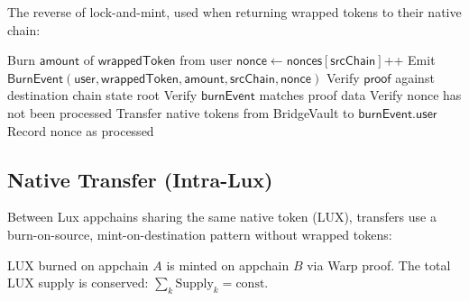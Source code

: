 The reverse of lock-and-mint, used when returning wrapped tokens to their native chain:

\begin{algorithm}[H]
\caption{Burn-and-Release Transfer Protocol}
\label{alg:burn_release}
\begin{algorithmic}[1]
    \State Burn $\mathsf{amount}$ of $\mathsf{wrappedToken}$ from user
    \State $\mathsf{nonce} \gets \mathsf{nonces}[\mathsf{srcChain}]$++
    \State Emit $\mathsf{BurnEvent}(\mathsf{user}, \mathsf{wrappedToken}, \mathsf{amount}, \mathsf{srcChain}, \mathsf{nonce})$
\EndProcedure
{}
    \State Verify $\mathsf{proof}$ against destination chain state root
    \State Verify $\mathsf{burnEvent}$ matches proof data
    \State Verify nonce has not been processed
    \State Transfer native tokens from BridgeVault to $\mathsf{burnEvent.user}$
    \State Record nonce as processed
\EndProcedure
\end{algorithmic}
\end{algorithm}

\subsection{Native Transfer (Intra-Lux)}

Between Lux appchains sharing the same native token (LUX), transfers use a burn-on-source, mint-on-destination pattern without wrapped tokens:

\begin{definition}
LUX burned on appchain $A$ is minted on appchain $B$ via Warp proof. The total LUX supply is conserved: $\sum_k \text{Supply}_k = \text{const}$.
\end{definition}

